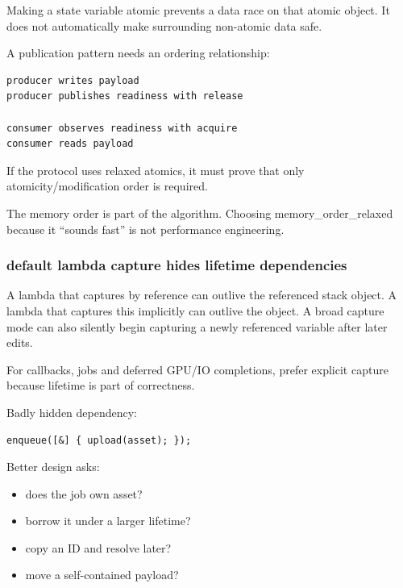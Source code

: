Making a state variable atomic prevents a data race on that atomic object. It does not automatically make surrounding non-atomic data safe.

A publication pattern needs an ordering relationship:

\begin{verbatim}
producer writes payload
producer publishes readiness with release

consumer observes readiness with acquire
consumer reads payload
\end{verbatim}

If the protocol uses relaxed atomics, it must prove that only atomicity/modification order is required.

The memory order is part of the algorithm. Choosing memory\_order\_relaxed because it ``sounds fast'' is not performance engineering.

\subsubsection{default lambda capture hides lifetime dependencies}\label{01-foundations-i-ch005-default-lambda-capture-hides-lifetime-dependencies}

\hypertarget{01-foundations-i-ch005-default-lambda-capture-hides-lifetime-dependencies}{}

A lambda that captures by reference can outlive the referenced stack object. A lambda that captures this implicitly can outlive the object. A broad capture mode can also silently begin capturing a newly referenced variable after later edits.

For callbacks, jobs and deferred GPU/IO completions, prefer explicit capture because lifetime is part of correctness.

Badly hidden dependency:

\begin{verbatim}
enqueue([&] { upload(asset); });
\end{verbatim}

Better design asks:

\begin{itemize}
\tightlist
\item
  does the job own asset?
\item
  borrow it under a larger lifetime?
\item
  copy an ID and resolve later?
\item
  move a self-contained payload?
\end{itemize}

